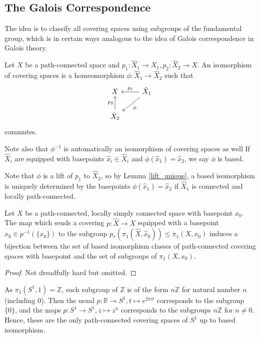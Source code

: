 \subsection{The Galois Correspondence}
The idea is to classify all covering spaces using subgroups of the fundamental group, which is in certain ways analogous to the idea of Galois correspondence in Galois theory.
\begin{definition}
    Let $X$ be a path-connected space and $p_1:\hat{X}_1\to X_1, p_2:\hat{X}_2\to X$.
    An isomorphism of covering spaces is a homeomorphism $\phi:\hat{X}_1\to\hat{X}_2$ such that
    \[
        \begin{tikzcd}
            X&\hat{X}_1\arrow{dl}{\phi}\arrow[swap]{l}{p_1}\\
            \hat{X}_2\arrow{u}{p_2}&
        \end{tikzcd}
    \]
    commutes.
\end{definition}
Note also that $\phi^{-1}$ is automatically an isomorphism of covering spaces as well
If $\hat{X}_i$ are equipped with basepoints $\hat{x}_i\in\hat{X}_i$ and $\phi(\hat{x}_1)=\hat{x}_2$, we say $\phi$ is based.
\begin{remark}
    Note that $\phi$ is a lift of $p_1$ to $\hat{X}_2$, so by Lemma \ref{lift_unique}, a based isomorphism is uniquely determined by the basepoints $\phi(\hat{x}_1)=\hat{x}_2$ if $\hat{X}_1$ is connected and locally path-connected.
\end{remark}
\begin{theorem}\label{based_galois}
    Let $X$ be a path-connected, locally simply connected space with basepoint $x_0$.
    The map which sends a covering $p:\hat{X}\to X$ equipped with a basepoint $\hat{x}_0\in p^{-1}(\{x_0\})$ to the subgroup $p_\ast(\pi_1(\hat{X},\hat{x}_0))\le\pi_1(X,x_0)$ induces a bijection between the set of based isomorphism classes of path-connected covering spaces with basepoint and the set of subgroups of $\pi_1(X,x_0)$.
\end{theorem}
\begin{proof}
    Not dreadfully hard but omitted.
\end{proof}
\begin{example}
    As $\pi_1(S^1,1)=\mathbb Z$, each subgroup of $\mathbb Z$ is of the form $n\mathbb Z$ for natural number $n$ (including $0$).
    Then the usual $p:\mathbb R\to S^1, t\mapsto e^{2\pi it}$ corresponds to the subgroup $\{0\}$, and the maps $p:S^1\to S^1, z\mapsto z^n$ corresponds to the subgroups $n\mathbb Z$ for $n\neq 0$.
    Hence, these are the only path-connected covering spaces of $S^1$ up to based isomorphism.
\end{example}
